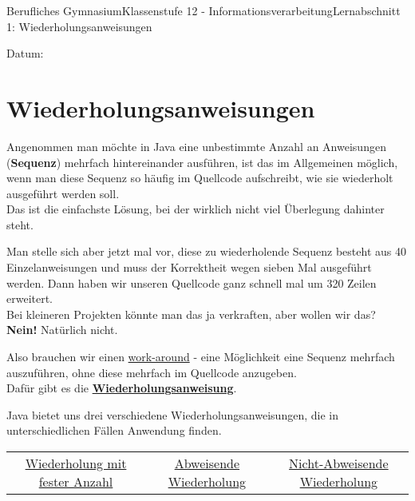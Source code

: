 \documentclass[11pt,oneside,openany,headings=optiontotoc,11pt,numbers=noenddot]{article}
\begin{document}
	\begin{worksheet}{Berufliches Gymnasium}{Klassenstufe 12 - Informationsverarbeitung}{Lernabschnitt 1: Wiederholungsanweisungen}
		\setlength{\columnseprule}{0pt}
		\begin{framed}
			Datum:
		\end{framed}
		\section{Wiederholungsanweisungen}
		Angenommen man möchte in Java eine unbestimmte Anzahl an Anweisungen (\textbf{Sequenz}) mehrfach hintereinander ausführen, ist das im Allgemeinen möglich, wenn man diese Sequenz so häufig im Quellcode aufschreibt, wie sie wiederholt ausgeführt werden soll.\\
		Das ist die einfachste Lösung, bei der wirklich nicht viel Überlegung dahinter steht.\\
		\par\noindent
		Man stelle sich aber jetzt mal vor, diese zu wiederholende Sequenz besteht aus 40 Einzelanweisungen und muss der Korrektheit wegen sieben Mal ausgeführt werden. Dann haben wir unseren Quellcode ganz schnell mal um 320 Zeilen erweitert.\\
		Bei kleineren Projekten könnte man das ja verkraften, aber wollen wir das? \textbf{Nein!} Natürlich nicht.
		\par
		Also brauchen wir einen \underline{work-around} - eine Möglichkeit eine Sequenz mehrfach auszuführen, ohne diese mehrfach im Quellcode anzugeben.\\
		Dafür gibt es die \textbf{\underline{Wiederholungsanweisung}}.\\
		\par\bigskip\noindent
		Java bietet uns drei verschiedene Wiederholungsanweisungen, die in unterschiedlichen Fällen Anwendung finden.\\
		\begin{tabularx}{\textwidth}{ccc}
			\underline{Wiederholung mit fester Anzahl} & \underline{Abweisende Wiederholung} & \underline{Nicht-Abweisende Wiederholung}
		\end{tabularx}

\end{worksheet}
\end{document}
